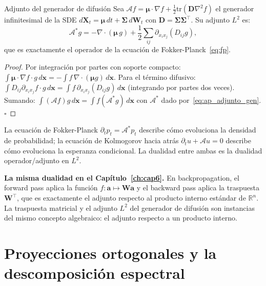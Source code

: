 \begin{proposicion}{Adjunto del generador de difusión}
\label{prop:ap_adjunto_gen}
Sea $\mathcal{A}f = \bm{\mu}\cdot\nabla f + \frac{1}{2}\mathrm{tr}(\bm{D}\nabla^2 f)$
el generador infinitesimal de la SDE $d\bm{X}_t = \bm{\mu}\,dt + \bm{\Sigma}\,d\bm{W}_t$
con $\bm{D} = \bm{\Sigma}\bm{\Sigma}^\top$. Su adjunto $L^2$ es:
\begin{equation}
  \mathcal{A}^*g
  = -\nabla\cdot(\bm{\mu}\,g) + \frac{1}{2}\sum_{ij}\partial_{x_ix_j}(D_{ij}g),
  \label{eq:ap_adjunto_gen}
\end{equation}
que es exactamente el operador de la ecuación de Fokker-Planck~\eqref{eq:fp}.
\end{proposicion}

\begin{proof}
Por integración por partes con soporte compacto:
$\int\bm{\mu}\cdot\nabla f\cdot g\,d\bm{x} = -\int f\,\nabla\cdot(\bm{\mu}g)\,d\bm{x}$.
Para el término difusivo: $\int D_{ij}\partial_{x_ix_j}f\cdot g\,d\bm{x}
= \int f\,\partial_{x_ix_j}(D_{ij}g)\,d\bm{x}$ (integrando por partes dos veces).
Sumando: $\int(\mathcal{A}f)g\,d\bm{x} = \int f(\mathcal{A}^*g)\,d\bm{x}$
con $\mathcal{A}^*$ dado por~\eqref{eq:ap_adjunto_gen}. $\square$
\end{proof}

La ecuación de Fokker-Planck $\partial_t p_t = \mathcal{A}^*p_t$ describe cómo
evoluciona la densidad de probabilidad; la ecuación de Kolmogorov hacia atrás
$\partial_t u + \mathcal{A}u = 0$ describe cómo evoluciona la esperanza
condicional. La dualidad entre ambas es la dualidad operador/adjunto en $L^2$.

\medskip\noindent\textbf{La misma dualidad en el Capítulo~\ref{ch:cap6}.}
En backpropagation, el forward pass aplica la función $f:\bm{a}\mapsto\bm{W}\bm{a}$
y el backward pass aplica la traspuesta $\bm{W}^\top$, que es exactamente el
adjunto respecto al producto interno estándar de $\mathbb{R}^n$. La traspuesta
matricial y el adjunto $L^2$ del generador de difusión son instancias del mismo
concepto algebraico: el adjunto respecto a un producto interno.

\section{Proyecciones ortogonales y la descomposición espectral}
\label{sec:ap_proyecciones}

